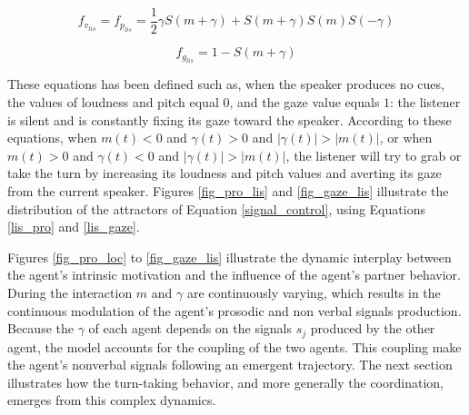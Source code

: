 \begin{equation}
f_{v_{lis}}= f_{p_{lis}} = \frac{1}{2} \gamma S(m+\gamma) + S(m+\gamma)S(m)S(-\gamma)
\label{lis_pro}
\end{equation}

\begin{equation}
f_{g_{lis}} = 1 - S(m + \gamma)
\label{lis_gaze}
\end{equation}

These equations has been defined such as, when the speaker produces no cues, the values of loudness and pitch equal $0$, and the gaze value equals $1$: the listener is silent and is constantly fixing its gaze toward the speaker. 
According to these equations, when $m(t)<0$ and $\gamma(t)>0$ and $|\gamma(t)|>|m(t)|$, or when $m(t)>0$ and $\gamma(t)<0$ and $|\gamma(t)|>|m(t)|$, the listener will try to grab or take the turn by increasing its loudness and pitch values and averting its gaze from the current speaker. Figures \ref{fig_pro_lis} and \ref{fig_gaze_lis} illustrate the distribution of the attractors of Equation \ref{signal_control}, using Equations \ref{lis_pro} and \ref{lis_gaze}.

Figures \ref{fig_pro_loc} to \ref{fig_gaze_lis} illustrate the dynamic interplay between the agent's intrinsic motivation and the influence of the agent's partner behavior.
During the interaction $m$ and $\gamma$ are continuously varying, which results in the continuous modulation of the agent's prosodic and non verbal signals production. Because the $\gamma$ of each agent depends on the signals $s_j$ produced by the other agent, the model accounts for the coupling of the two agents. This coupling make the agent's nonverbal signals following an emergent trajectory. The next section illustrates how the turn-taking behavior, and more generally the coordination, emerges from this complex dynamics. 


